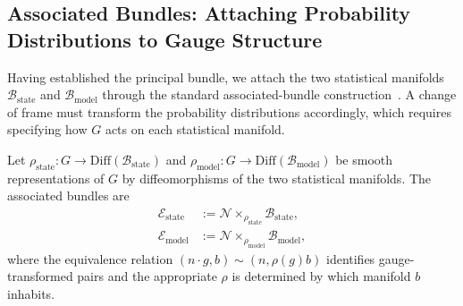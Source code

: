 \subsection{Associated Bundles: Attaching Probability Distributions to Gauge Structure}

Having established the principal bundle, we attach the two statistical manifolds $\mathcal{B}_{\mathrm{state}}$ and $\mathcal{B}_{\mathrm{model}}$ through the standard associated-bundle construction~\cite{Kobayashi1963, Nakahara2003, frankel2011geometry}. A change of frame must transform the probability distributions accordingly, which requires specifying how $G$ acts on each statistical manifold.

\begin{definition}
Let $\rho_{\mathrm{state}}: G \to \mathrm{Diff}(\mathcal{B}_{\mathrm{state}})$ and $\rho_{\mathrm{model}}: G \to \mathrm{Diff}(\mathcal{B}_{\mathrm{model}})$ be smooth representations of $G$ by diffeomorphisms of the two statistical manifolds. The associated bundles are
\begin{align}
\mathcal{E}_{\mathrm{state}} &:= \mathcal{N} \times_{\rho_{\mathrm{state}}} \mathcal{B}_{\mathrm{state}}, \\
\mathcal{E}_{\mathrm{model}} &:= \mathcal{N} \times_{\rho_{\mathrm{model}}} \mathcal{B}_{\mathrm{model}},
\end{align}
where the equivalence relation $(n \cdot g, b) \sim (n, \rho(g)b)$ identifies gauge-transformed pairs and the appropriate $\rho$ is determined by which manifold $b$ inhabits.
\end{definition}

